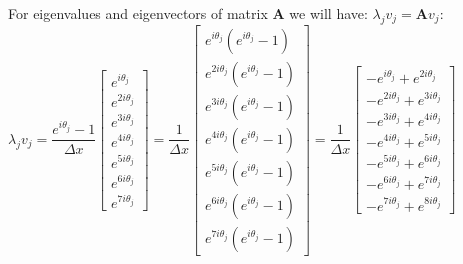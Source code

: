 \documentclass[14pt,a4paper]{article}
\begin{document}
\begin{enumerate}
	For eigenvalues and eigenvectors of matrix \textbf{A} we will have: $\lambda_jv_j = \textbf{A}v_j $: \\
	$\lambda_jv_j = \dfrac{e^{i\theta_j}-1}{\Delta x}\begin{bmatrix} e^{i\theta_j} \\ e^{2i\theta_j} \\ e^{3i\theta_j} \\ e^{4i\theta_j} \\ e^{5i\theta_j} \\ e^{6i\theta_j} \\ e^{7i\theta_j} \end{bmatrix} = \dfrac{1}{\Delta x} \begin{bmatrix} e^{i\theta_j}(e^{i\theta_j}-1) \\ e^{2i\theta_j}(e^{i\theta_j}-1) \\ e^{3i\theta_j}(e^{i\theta_j}-1) \\ e^{4i\theta_j}(e^{i\theta_j}-1) \\ e^{5i\theta_j}(e^{i\theta_j}-1) \\ e^{6i\theta_j}(e^{i\theta_j}-1) \\ e^{7i\theta_j}(e^{i\theta_j}-1) \end{bmatrix} = \dfrac{1}{\Delta x} \begin{bmatrix} - e^{i\theta_j} +  e^{2i\theta_j}  \\ - e^{2i\theta_j} + e^{3i\theta_j} \\ - e^{3i\theta_j} + e^{4i\theta_j} \\ - e^{4i\theta_j}+ e^{5i\theta_j} \\ - e^{5i\theta_j} + e^{6i\theta_j} \\ - e^{6i\theta_j} + e^{7i\theta_j} \\ - e^{7i\theta_j} + e^{8i\theta_j}\end{bmatrix}  $\\
	

\end{enumerate}
\end{document}
